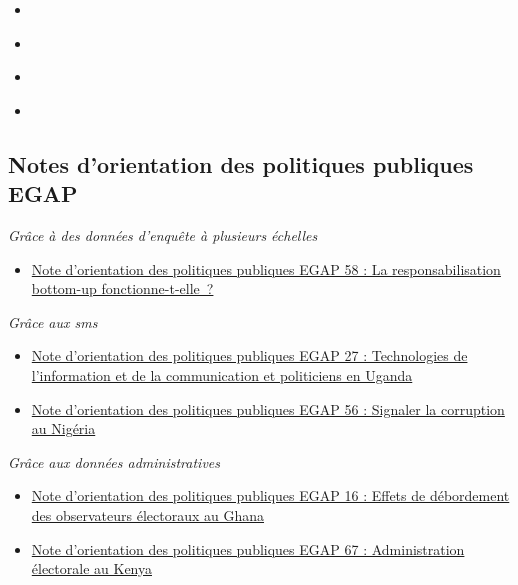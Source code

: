 \documentclass[12pt,]{book}
\providecommand{\tightlist}{%
  \setlength{\itemsep}{0pt}\setlength{\parskip}{0pt}}
\begin{document}
\begin{itemize}
\item
  \autocite{adcocoll:2001}
\item
  \autocite{scacco_can_2018}
\item
  \autocite{shadish2002experimental}
\item
  \autocite{vicente_is_2014}
\end{itemize}

\hypertarget{notes-dorientation-des-politiques-publiques-egap-2}{%
\subsection{Notes d'orientation des politiques publiques EGAP}\label{notes-dorientation-des-politiques-publiques-egap-2}}

\emph{Grâce à des données d'enquête à plusieurs échelles}

\begin{itemize}
\tightlist
\item
  \href{https://egap.org/resource/does-bottom-up-accountability-work-evidence-from-uganda/}{Note d'orientation des politiques publiques EGAP 58 : La responsabilisation bottom-up fonctionne-t-elle~?}
\end{itemize}

\emph{Grâce aux sms}

\begin{itemize}
\item
  \href{https://egap.org/resource/brief-27-ict-and-politicians-in-uganda/}{Note d'orientation des politiques publiques EGAP 27 : Technologies de l'information et de la communication et politiciens en Uganda}
\item
  \href{https://egap.org/resource/reporting-corruption-in-nigeria-testing-the-effects-of-norms-nudges/}{Note d'orientation des politiques publiques EGAP 56 : Signaler la corruption au Nigéria}
\end{itemize}

\emph{Grâce aux données administratives}

\begin{itemize}
\item
  \href{https://egap.org/resource/brief-16-spillover-effects-of-observers-in-ghana/}{Note d'orientation des politiques publiques EGAP 16 : Effets de débordement des observateurs électoraux au Ghana}
\item
  \href{https://egap.org/resource/electoral-administration-in-kenya/}{Note d'orientation des politiques publiques EGAP 67 : Administration électorale au Kenya}
\end{itemize}
\end{document}
